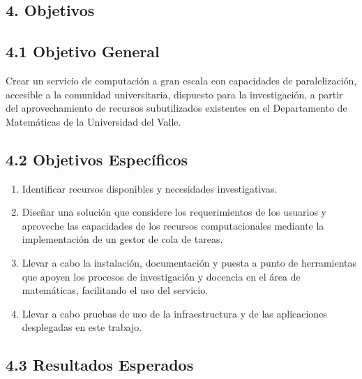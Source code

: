 \begin{doublespace}
  \begin{tightcenter}
    \section{4. Objetivos}
    \mylinespacing
  \end{tightcenter}

  \subsection{4.1  Objetivo General}

  Crear un servicio de computación a gran escala con capacidades de paralelización, accesible a la comunidad universitaria, dispuesto para la investigación, a partir del aprovechamiento de recursos subutilizados existentes en el Departamento de Matemáticas de la Universidad del Valle.

  \subsection{4.2  Objetivos Específicos}

  \begin{enumerate}
    \item Identificar recursos disponibles y necesidades investigativas.
    \item Diseñar una solución que considere los requerimientos de los usuarios y aproveche las capacidades de los recursos computacionales mediante la implementación de un gestor de cola de tareas.
    \item Llevar a cabo la instalación, documentación y puesta a punto de herramientas que apoyen los procesos de investigación y docencia en el área de matemáticas, facilitando el uso del servicio.
    \item  Llevar a cabo pruebas de uso de la infraestructura y de las aplicaciones desplegadas en este trabajo.
  \end{enumerate}

  \let\cleardoublepage\clearpage
  \newpage
  \subsection{4.3 Resultados Esperados}


\end{doublespace}
